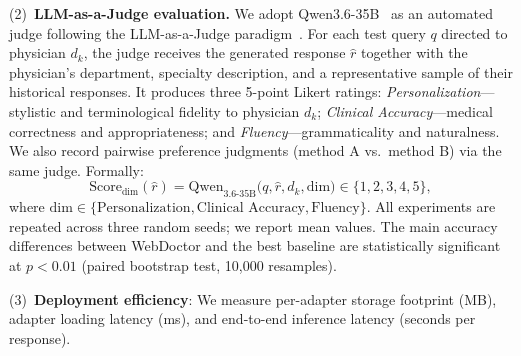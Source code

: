 (2)~\textbf{LLM-as-a-Judge evaluation.} We adopt Qwen3.6-35B~\cite{qwen36_35b_a3b} as an automated judge following the LLM-as-a-Judge paradigm~\cite{NEURIPS2023_91f18a12}. For each test query $q$ directed to physician $d_k$, the judge receives the generated response $\hat{r}$ together with the physician's department, specialty description, and a representative sample of their historical responses. It produces three 5-point Likert ratings:
\emph{Personalization}---stylistic and terminological fidelity to physician $d_k$; \emph{Clinical Accuracy}---medical correctness and appropriateness; and \emph{Fluency}---grammaticality and naturalness. We also record pairwise preference judgments (method A vs.\ method B) via the same judge. Formally:
\begin{equation}
\mathrm{Score}_{\mathrm{dim}}(\hat{r}) = \mathrm{Qwen}_{3.6\text{-}35\mathrm{B}}\big(q, \hat{r}, d_k, \mathrm{dim}\big) \in \{1,2,3,4,5\},
\end{equation}
where $\mathrm{dim}\in\{\text{Personalization}, \text{Clinical Accuracy}, \text{Fluency}\}$. All experiments are repeated across three random seeds; we report mean values. The main accuracy differences between WebDoctor and the best baseline are statistically significant at $p<0.01$ (paired bootstrap test, 10,000 resamples).

(3)~\textbf{Deployment efficiency}: We measure per-adapter storage footprint (MB), adapter loading latency (ms), and end-to-end inference latency (seconds per response).

